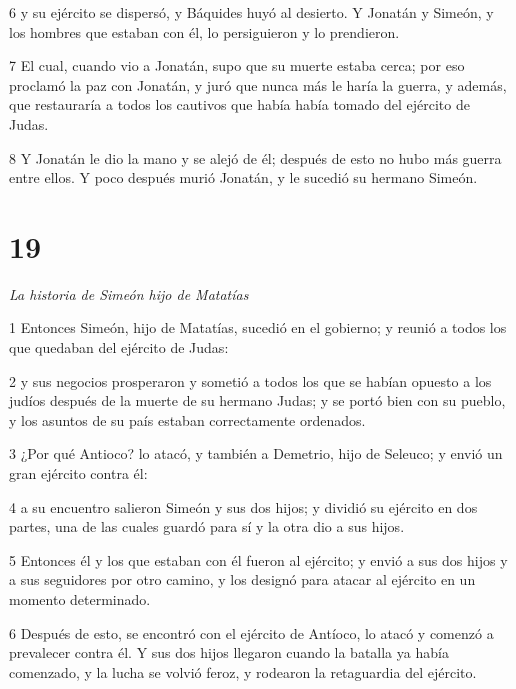 \par 6 y su ejército se dispersó, y Báquides huyó al desierto. Y Jonatán y Simeón, y los hombres que estaban con él, lo persiguieron y lo prendieron.

\par 7 El cual, cuando vio a Jonatán, supo que su muerte estaba cerca; por eso proclamó la paz con Jonatán, y juró que nunca más le haría la guerra, y además, que restauraría a todos los cautivos que había había tomado del ejército de Judas.

\par 8 Y Jonatán le dio la mano y se alejó de él; después de esto no hubo más guerra entre ellos. Y poco después murió Jonatán, y le sucedió su hermano Simeón.


\chapter{19}

\par \textit{La historia de Simeón hijo de Matatías}

\par 1 Entonces Simeón, hijo de Matatías, sucedió en el gobierno; y reunió a todos los que quedaban del ejército de Judas:

\par 2 y sus negocios prosperaron y sometió a todos los que se habían opuesto a los judíos después de la muerte de su hermano Judas; y se portó bien con su pueblo, y los asuntos de su país estaban correctamente ordenados.

\par 3 ¿Por qué Antioco? lo atacó, y también a Demetrio, hijo de Seleuco; y envió un gran ejército contra él:

\par 4 a su encuentro salieron Simeón y sus dos hijos; y dividió su ejército en dos partes, una de las cuales guardó para sí y la otra dio a sus hijos.

\par 5 Entonces él y los que estaban con él fueron al ejército; y envió a sus dos hijos y a sus seguidores por otro camino, y los designó para atacar al ejército en un momento determinado.

\par 6 Después de esto, se encontró con el ejército de Antíoco, lo atacó y comenzó a prevalecer contra él. Y sus dos hijos llegaron cuando la batalla ya había comenzado, y la lucha se volvió feroz, y rodearon la retaguardia del ejército.

